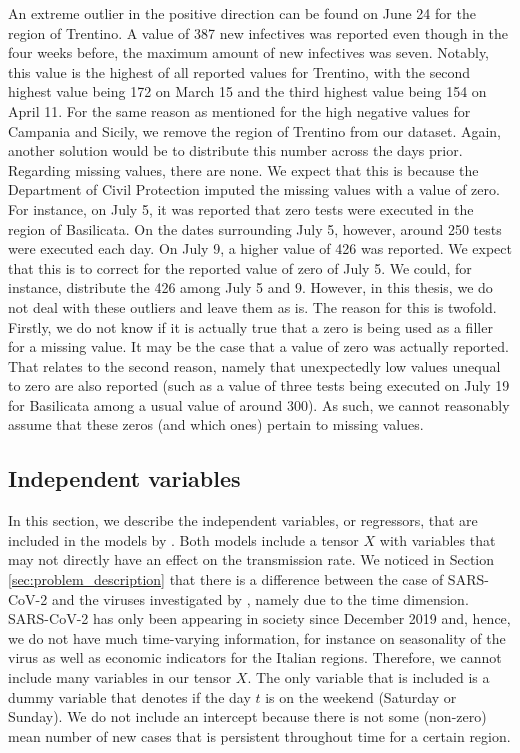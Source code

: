 \documentclass[12pt]{article}
\begin{document}
	An extreme outlier in the positive direction can be found on June 24 for the region of Trentino. A value of 387 new infectives was reported even though in the four weeks before, the maximum amount of new infectives was seven. Notably, this value is the highest of all reported values for Trentino, with the second highest value being 172 on March 15 and the third highest value being 154 on April 11. For the same reason as mentioned for the high negative values for Campania and Sicily, we remove the region of Trentino from our dataset. Again, another solution would be to distribute this number across the days prior. \\
	
	Regarding missing values, there are none. We expect that this is because the Department of Civil Protection imputed the missing values with a value of zero. For instance, on July 5, it was reported that zero tests were executed in the region of Basilicata. On the dates surrounding July 5, however, around 250 tests were executed each day. On July 9, a higher value of 426 was reported. We expect that this is to correct for the reported value of zero of July 5. We could, for instance, distribute the 426 among July 5 and 9. However, in this thesis, we do not deal with these outliers and leave them as is. The reason for this is twofold. Firstly, we do not know if it is actually true that a zero is being used as a filler for a missing value. It may be the case that a value of zero was actually reported. That relates to the second reason, namely that unexpectedly low values unequal to zero are also reported (such as a value of three tests being executed on July 19 for Basilicata among a usual value of around 300). As such, we cannot reasonably assume that these zeros (and which ones) pertain to missing values.
	
	\subsection{Independent variables} \label{subsec:regressor_data}
	In this section, we describe the independent variables, or regressors, that are included in the models by \textcite{adda2016economic}. Both models include a tensor $X$ with variables that may not directly have an effect on the transmission rate. We noticed in Section \ref{sec:problem_description} that there is a difference between the case of SARS-CoV-2 and the viruses investigated by \textcite{adda2016economic}, namely due to the time dimension. SARS-CoV-2 has only been appearing in society since December 2019 and, hence, we do not have much time-varying information, for instance on seasonality of the virus as well as economic indicators for the Italian regions. Therefore, we cannot include many variables in our tensor $X$. The only variable that is included is a dummy variable that denotes if the day $t$ is on the weekend (Saturday or Sunday). We do not include an intercept because there is not some (non-zero) mean number of new cases that is persistent throughout time for a certain region. \\
	
\end{document}
